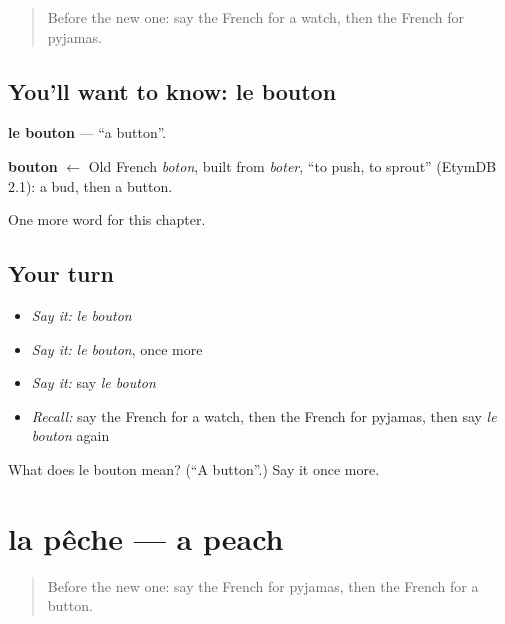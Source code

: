 \label{lesson:FR-C221-bouton}



\begin{quote}
Before the new one: say the French for a watch, then the French for pyjamas.
\end{quote}

\subsection*{You'll want to know: le bouton}
\textbf{le bouton} — \textquotedblleft{}a button\textquotedblright{}.

\begin{cousinweb}
\textbf{bouton} $\leftarrow$ Old French \emph{boton}, built from \emph{boter}, \textquotedblleft{}to push, to sprout\textquotedblright{} (EtymDB 2.1): a bud, then a button.
\end{cousinweb}

\begin{grammarlens}[title={What you've built}]
One more word for this chapter.
\end{grammarlens}

\subsection*{Your turn}
\begin{itemize}
\raggedright
  \item \emph{Say it:} \emph{le bouton}
  \item \emph{Say it:} \emph{le bouton}, once more
  \item \emph{Say it:} say \emph{le bouton}
  \item \emph{Recall:} say the French for a watch, then the French for pyjamas, then say \emph{le bouton} again
\end{itemize}

\begin{tcolorbox}[breakable,colback=teal!4,colframe=teal!35!black,title={Before you move on}]
What does le bouton mean? (\textquotedblleft{}A button\textquotedblright{}.) Say it once more.
\end{tcolorbox}
\section[la pêche]{la pêche — a peach}

\label{lesson:FR-C221-peche}



\begin{quote}
Before the new one: say the French for pyjamas, then the French for a button.
\end{quote}


